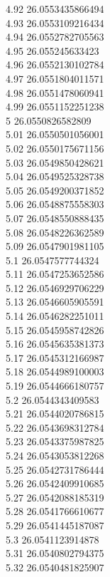 {4.92	26.0553435866494\\
4.93	26.0553109216434\\
4.94	26.0552782705563\\
4.95	26.055245633423\\
4.96	26.0552130102784\\
4.97	26.0551804011571\\
4.98	26.0551478060941\\
4.99	26.0551152251238\\
5	26.0550826582809\\
5.01	26.0550501056001\\
5.02	26.0550175671156\\
5.03	26.0549850428621\\
5.04	26.0549525328738\\
5.05	26.0549200371852\\
5.06	26.0548875558303\\
5.07	26.0548550888435\\
5.08	26.0548226362589\\
5.09	26.0547901981105\\
5.1	26.0547577744324\\
5.11	26.0547253652586\\
5.12	26.0546929706229\\
5.13	26.0546605905591\\
5.14	26.0546282251011\\
5.15	26.0545958742826\\
5.16	26.0545635381373\\
5.17	26.0545312166987\\
5.18	26.0544989100003\\
5.19	26.0544666180757\\
5.2	26.0544343409583\\
5.21	26.0544020786815\\
5.22	26.0543698312784\\
5.23	26.0543375987825\\
5.24	26.0543053812268\\
5.25	26.0542731786444\\
5.26	26.0542409910685\\
5.27	26.0542088185319\\
5.28	26.0541766610677\\
5.29	26.0541445187087\\
5.3	26.0541123914878\\
5.31	26.0540802794375\\
5.32	26.0540481825907\\
}
